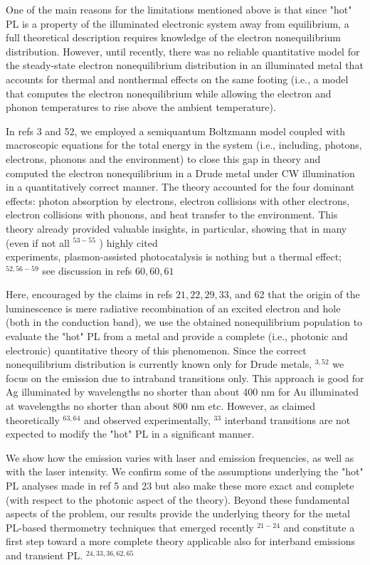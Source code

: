 \documentclass[10pt]{article}
\begin{document}
One of the main reasons for the limitations mentioned above is that since "hot" PL is a property of the illuminated electronic system away from equilibrium, a full theoretical description requires knowledge of the electron nonequilibrium distribution. However, until recently, there was no reliable quantitative model for the steady-state electron nonequilibrium distribution in an illuminated metal that accounts for thermal and nonthermal effects on the same footing (i.e., a model that computes the electron nonequilibrium while allowing the electron and phonon temperatures to rise above the ambient temperature).

In refs 3 and 52, we employed a semiquantum Boltzmann model coupled with macroscopic equations for the total energy in the system (i.e., including, photons, electrons, phonons and the environment) to close this gap in theory and computed the electron nonequilibrium in a Drude metal under CW illumination in a quantitatively correct manner. The theory accounted for the four dominant effects: photon absorption by electrons, electron collisions with other electrons, electron collisions with phonons, and heat transfer to the environment. This theory already provided valuable insights, in particular, showing that in many (even if not all ${ }^{53-55}$ ) highly cited\\
experiments, plasmon-assisted photocatalysis is nothing but a thermal effect; ${ }^{52,56-59}$ see discussion in refs $60,60,61$

Here, encouraged by the claims in refs $21,22,29,33$, and 62 that the origin of the luminescence is mere radiative recombination of an excited electron and hole (both in the conduction band), we use the obtained nonequilibrium population to evaluate the "hot" PL from a metal and provide a complete (i.e., photonic and electronic) quantitative theory of this phenomenon. Since the correct nonequilibrium distribution is currently known only for Drude metals, ${ }^{3,52}$ we focus on the emission due to intraband transitions only. This approach is good for Ag illuminated by wavelengths no shorter than about 400 nm for Au illuminated at wavelengths no shorter than about 800 nm etc. However, as claimed theoretically ${ }^{63,64}$ and observed experimentally, ${ }^{33}$ interband transitions are not expected to modify the "hot" PL in a significant manner.

We show how the emission varies with laser and emission frequencies, as well as with the laser intensity. We confirm some of the assumptions underlying the "hot" PL analyses made in ref 5 and 23 but also make these more exact and complete (with respect to the photonic aspect of the theory). Beyond these fundamental aspects of the problem, our results provide the underlying theory for the metal PL-based thermometry techniques that emerged recently ${ }^{21-24}$ and constitute a first step toward a more complete theory applicable also for interband emissions and transient PL. ${ }^{24,33,36,62,65}$
\end{document}
